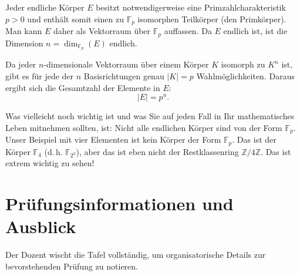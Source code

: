 \begin{math-stroke}
Jeder endliche Körper $E$ besitzt notwendigerweise eine Primzahlcharakteristik $p>0$ und enthält somit einen zu $\mathbb{F}_p$ isomorphen Teilkörper (den Primkörper). Man kann $E$ daher als Vektorraum über $\mathbb{F}_p$ auffassen. Da $E$ endlich ist, ist die Dimension $n = \dim_{\mathbb{F}_p}(E)$ endlich. 
\begin{explanation-of-steps}
Da jeder $n$-dimensionale Vektorraum über einem Körper $K$ isomorph zu $K^n$ ist, gibt es für jede der $n$ Basisrichtungen genau $|K| = p$ Wahlmöglichkeiten. Daraus ergibt sich die Gesamtzahl der Elemente in $E$:
\[
|E| = p^n.
\]
\end{explanation-of-steps}
\end{math-stroke}

\begin{spoken-clean}[01:11:09 - 01:12:58]
Was vielleicht noch wichtig ist und was Sie auf jeden Fall in Ihr mathematisches Leben mitnehmen sollten, ist: Nicht alle endlichen Körper sind von der Form $\mathbb{F}_p$. Unser Beispiel mit vier Elementen ist kein Körper der Form $\mathbb{F}_p$. Das ist der Körper $\mathbb{F}_4$ (d.\,h. $\mathbb{F}_{2^2}$), aber das ist eben nicht der Restklassenring $\mathbb{Z}/4\mathbb{Z}$. Das ist extrem wichtig zu sehen!
\end{spoken-clean}

\begin{math-stroke}
\end{math-stroke}

\section{Prüfungsinformationen und Ausblick}

\begin{meta-note}
Der Dozent wischt die Tafel vollständig, um organisatorische Details zur bevorstehenden Prüfung zu notieren.
\end{meta-note}

